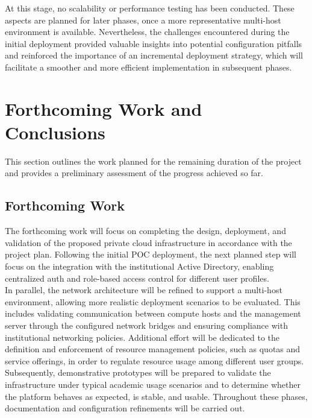\documentclass[sigplan]{acmart}
\begin{document}
        At this stage, no scalability or performance testing has been conducted. These aspects are planned for later phases, once a more representative multi-host environment is available. Nevertheless, the challenges encountered during the initial deployment provided valuable insights into potential configuration pitfalls and reinforced the importance of an incremental deployment strategy, which will facilitate a smoother and more efficient implementation in subsequent phases.

\section{Forthcoming Work and Conclusions} \label{sec:conclusions}
    This section outlines the work planned for the remaining duration of the project and provides a preliminary assessment of the progress achieved so far.

    \subsection{Forthcoming Work}
        The forthcoming work will focus on completing the design, deployment, and validation of the proposed private cloud infrastructure in accordance with the project plan. Following the initial POC deployment, the next planned step will focus on the integration with the institutional Active Directory, enabling centralized auth and role-based access control for different user profiles.\\

        In parallel, the network architecture will be refined to support a multi-host environment, allowing more realistic deployment scenarios to be evaluated. This includes validating communication between compute hosts and the management server through the configured network bridges and ensuring compliance with institutional networking policies. Additional effort will be dedicated to the definition and enforcement of resource management policies, such as quotas and service offerings, in order to regulate resource usage among different user groups.\\
        
        Subsequently, demonstrative prototypes will be prepared to validate the infrastructure under typical academic usage scenarios and to determine whether the platform behaves as expected, is stable, and usable. Throughout these phases, documentation and configuration refinements will be carried out.
    
\end{document}
